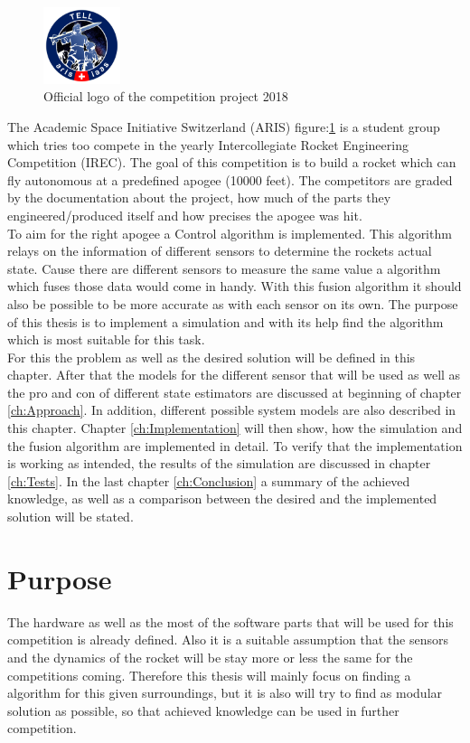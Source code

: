  \begin{figure}[h!]
 \centering
 \includegraphics[width=0.2\textwidth]{./Pictures/ARIS_TELL_Badge.png}
 \caption{Official logo of the competition project 2018}
 \label{fig:ArisTell}
\end{figure}

 The Academic Space Initiative Switzerland (ARIS) figure:\ref{fig:ArisTell} is a student group which tries too compete in the yearly Intercollegiate Rocket Engineering Competition (IREC).
 The goal of this competition is to build a rocket which can fly autonomous at a predefined apogee (10000 feet).
 The competitors are graded by the documentation about the project, how much of the parts they engineered/produced itself and how precises the apogee was hit. \\
 To aim for the right apogee a Control algorithm is implemented. 
 This algorithm relays on the information of different sensors to determine the rockets actual state.
 Cause there are different sensors to measure the same value a algorithm which fuses those data would come in handy.
 With this fusion algorithm it should also be possible to be more accurate as with each sensor on its own.
 The purpose of this thesis is to implement a simulation and with its help find the algorithm which is most suitable for this task.\\
 For this the problem as well as the desired solution will be defined in this chapter.
 After that the models for the different sensor that will be used as well as the pro and con of different state estimators are discussed at beginning of chapter \ref{ch:Approach}.
 In addition, different possible system models are also described in this chapter.
 Chapter \ref{ch:Implementation} will then show, how the simulation and the fusion algorithm are implemented in detail.
 To verify that the implementation is working as intended, the results of the simulation are discussed in chapter \ref{ch:Tests}.
 In the last chapter \ref{ch:Conclusion} a summary of the achieved knowledge, as well as a comparison between the desired and the implemented solution will be stated.
 \newpage
 
 \section{Purpose}
 The hardware as well as the most of the software parts that will be used for this competition is already defined.
 Also it is a suitable assumption that the sensors and the dynamics of the rocket will be stay more or less the same for the competitions coming.
 Therefore this thesis will mainly focus on finding a algorithm for this given surroundings, but it is also will try to find as modular solution as possible, 
 so that achieved knowledge can be used in further competition.
  
